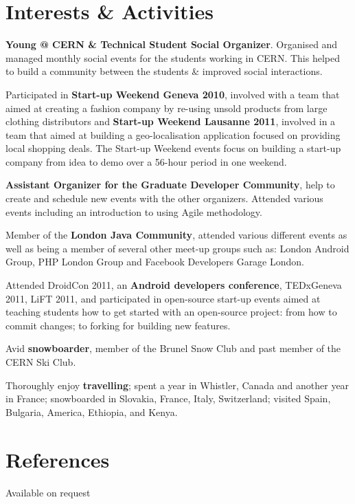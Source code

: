 \documentclass[final,a4paper,notitlepage,10pt]{report}
\begin{document}
\section*{Interests \& Activities {\hfill\raisebox{.5ex}{\makebox[.65\textwidth]{\hrulefill}}}}
\begin{compactitemize}
\item \textbf{Young @ CERN \& Technical Student Social Organizer}. Organised and managed monthly social events for the students working in CERN. This helped to build a community between the students \& improved social interactions.
\item Participated in \textbf{Start-up Weekend Geneva 2010}, involved with a team that aimed at creating a fashion company by re-using unsold products from large clothing distributors and \textbf{Start-up Weekend Lausanne 2011}, involved in a team that aimed at building a geo-localisation application focused on providing local shopping deals. The Start-up Weekend events focus on building a start-up company from idea to demo over a 56-hour period in one weekend.
\item \textbf{Assistant Organizer for the Graduate Developer Community}, help to create and schedule new events with the other organizers. Attended various events including an introduction to using Agile methodology.
\item Member of the \textbf{London Java Community}, attended various different events as well as being a member of several other meet-up groups such as: London Android Group, PHP London Group and Facebook Developers Garage London.
\item Attended DroidCon 2011, an \textbf{Android developers conference}, TEDxGeneva 2011, LiFT 2011, and participated in open-source start-up events aimed at teaching students how to get started with an open-source project: from how to commit changes; to forking for building new features.
\item Avid \textbf{snowboarder}, member of the Brunel Snow Club and past member of the CERN Ski Club.
\item Thoroughly enjoy \textbf{travelling}; spent a year in Whistler, Canada and another year in France; snowboarded in Slovakia, France, Italy, Switzerland; visited Spain, Bulgaria, America, Ethiopia, and Kenya.
\end{compactitemize}

\section*{References {\hfill\raisebox{.5ex}{\makebox[.65\textwidth]{\hrulefill}}}}
Available on request
\end{document}
